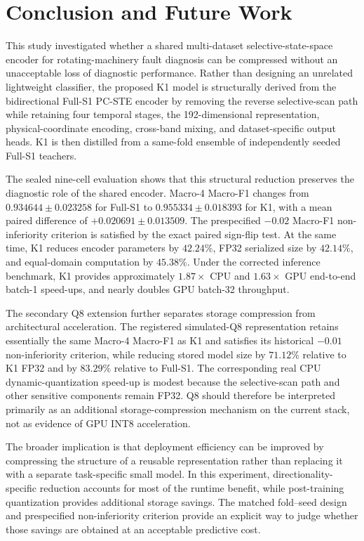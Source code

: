 \section{Conclusion and Future Work}
\label{sec:conclusion}

This study investigated whether a shared multi-dataset selective-state-space encoder for rotating-machinery fault diagnosis can be compressed without an unacceptable loss of diagnostic performance. Rather than designing an unrelated lightweight classifier, the proposed K1 model is structurally derived from the bidirectional Full-S1 PC-STE encoder by removing the reverse selective-scan path while retaining four temporal stages, the 192-dimensional representation, physical-coordinate encoding, cross-band mixing, and dataset-specific output heads. K1 is then distilled from a same-fold ensemble of independently seeded Full-S1 teachers.

The sealed nine-cell evaluation shows that this structural reduction preserves the diagnostic role of the shared encoder. Macro-4 Macro-F1 changes from $0.934644\pm0.023258$ for Full-S1 to $0.955334\pm0.018393$ for K1, with a mean paired difference of $+0.020691\pm0.013509$. The prespecified $-0.02$ Macro-F1 non-inferiority criterion is satisfied by the exact paired sign-flip test. At the same time, K1 reduces encoder parameters by $42.24\%$, FP32 serialized size by $42.14\%$, and equal-domain computation by $45.38\%$. Under the corrected inference benchmark, K1 provides approximately $1.87\times$ CPU and $1.63\times$ GPU end-to-end batch-1 speed-ups, and nearly doubles GPU batch-32 throughput.

The secondary Q8 extension further separates storage compression from architectural acceleration. The registered simulated-Q8 representation retains essentially the same Macro-4 Macro-F1 as K1 and satisfies its historical $-0.01$ non-inferiority criterion, while reducing stored model size by $71.12\%$ relative to K1 FP32 and by $83.29\%$ relative to Full-S1. The corresponding real CPU dynamic-quantization speed-up is modest because the selective-scan path and other sensitive components remain FP32. Q8 should therefore be interpreted primarily as an additional storage-compression mechanism on the current stack, not as evidence of GPU INT8 acceleration.

The broader implication is that deployment efficiency can be improved by compressing the structure of a reusable representation rather than replacing it with a separate task-specific small model. In this experiment, directionality-specific reduction accounts for most of the runtime benefit, while post-training quantization provides additional storage savings. The matched fold--seed design and prespecified non-inferiority criterion provide an explicit way to judge whether those savings are obtained at an acceptable predictive cost.

